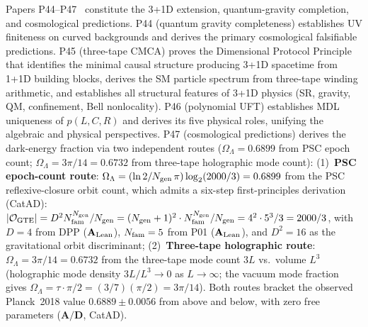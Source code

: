 Papers P44--P47~\cite{SpivackQGR,SpivackThreeTapeCMCA,SpivackGTEPolynomialUFT,SpivackGTECosmology}
constitute the 3+1D extension, quantum-gravity completion, and cosmological predictions.
P44 (quantum gravity completeness) establishes UV finiteness on curved backgrounds
and derives the primary cosmological falsifiable predictions.
P45 (three-tape CMCA) proves the Dimensional Protocol Principle that identifies the
minimal causal structure producing 3+1D spacetime from 1+1D building blocks, derives
the SM particle spectrum from three-tape winding arithmetic, and establishes all
structural features of 3+1D physics (SR, gravity, QM, confinement, Bell nonlocality).
P46 (polynomial UFT) establishes MDL uniqueness of $p(L,C,R)$ and derives its
five physical roles, unifying the algebraic and physical perspectives.
P47 (cosmological predictions) derives the dark-energy fraction via two independent
routes ($\Omega_\Lambda = 0.6899$ from PSC epoch count; $\Omega_\Lambda = 3\pi/14 =
0.6732$ from three-tape holographic mode count):
(1)~\textbf{PSC epoch-count route}: $\Omega_\Lambda = (\ln 2/N_{\rm gen}\,\pi)\log_2(2000/3) = 0.6899$
from the PSC reflexive-closure orbit count, which admits a six-step first-principles
derivation (CatAD): $|\mathcal{O}_{\rm GTE}| = D^2 N_{\rm fam}^{N_{\rm gen}}/N_{\rm gen}
= (N_{\rm gen}+1)^2\cdot N_{\rm fam}^{N_{\rm gen}}/N_{\rm gen} = 4^2\cdot 5^3/3 = 2000/3$,
with $D=4$ from DPP ($\mathbf{A}_{\rm Lean}$), $N_{\rm fam}=5$ from P01 ($\mathbf{A}_{\rm Lean}$),
and $D^2=16$ as the gravitational orbit discriminant;
(2)~\textbf{Three-tape holographic route}: $\Omega_\Lambda = 3\pi/14 = 0.6732$
from the three-tape mode count $3L$ vs.\ volume $L^3$ (holographic mode
density $3L/L^3 \to 0$ as $L \to \infty$; the vacuum mode fraction gives
$\Omega_\Lambda = \tau \cdot \pi/2 = (3/7)(\pi/2) = 3\pi/14$).
Both routes bracket the observed Planck~2018 value $0.6889 \pm 0.0056$ from above
and below, with zero free parameters ($\mathbf{A/D}$, CatAD).

